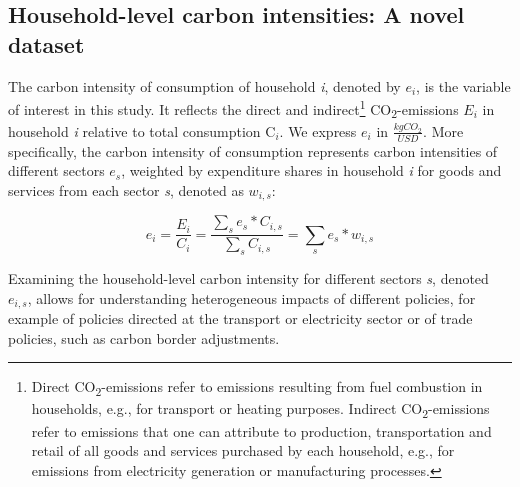 \documentclass[12pt, a4paper]{article}
\begin{document}
\subsection{Household-level carbon intensities: A novel dataset} \label{sec:data}

The carbon intensity of consumption of household \textit{i}, denoted by $e_{i}$, is the variable of interest in this study. It reflects the direct and indirect\footnote{Direct CO\textsubscript{2}-emissions refer to emissions resulting from fuel combustion in households, e.g., for transport or heating purposes. Indirect CO\textsubscript{2}-emissions refer to emissions that one can attribute to production, transportation and retail of all goods and services purchased by each household, e.g., for emissions from electricity generation or manufacturing processes.} CO\textsubscript{2}-emissions $E_{i}$ in household \textit{i} relative to total consumption C$_{i}$. We express $e_{i}$ in $\frac{kgCO_{2}}{USD}$. More specifically, the carbon intensity of consumption represents carbon intensities of different sectors $e_{s}$, weighted by expenditure shares in household \textit{i} for goods and services from each sector \textit{s}, denoted as $w_{i,s}$:


\begin{equation} \label{eq:ei}
e_{i} = \frac{E_{i}}{C_{i}} = \frac{\sum_{s} e_{s}*C_{i,s}}{\sum_{s} C_{i,s}} = \sum_{s} e_{s}*w_{i,s}
\end{equation}


Examining the household-level carbon intensity for different sectors \textit{s}, denoted $e_{i,s}$, allows for understanding heterogeneous impacts of different policies, for example of policies directed at the transport or electricity sector or of trade policies, such as carbon border adjustments.

\end{document}
